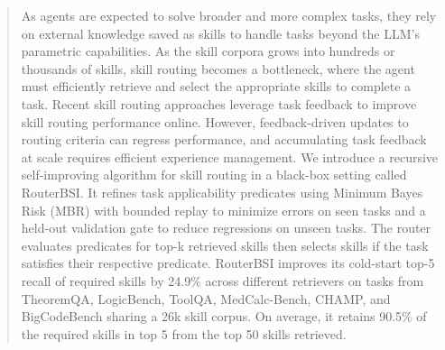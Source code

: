 
\begin{abstract}

As agents are expected to solve broader and more complex tasks, they rely on external knowledge saved as skills to handle tasks beyond the LLM's parametric capabilities. As the skill corpora grows into hundreds or thousands of skills, skill routing becomes a bottleneck, where the agent must efficiently retrieve and select the appropriate skills to complete a task. Recent skill routing approaches leverage task feedback to improve skill routing performance online. However, feedback-driven updates to routing criteria can regress performance, and accumulating task feedback at scale requires efficient experience management. We introduce a recursive self-improving algorithm for skill routing in a black-box setting called RouterBSI. It refines task applicability predicates using Minimum Bayes Risk (MBR) with bounded replay to minimize errors on seen tasks and a held-out validation gate to reduce regressions on unseen tasks. The router evaluates predicates for top-k retrieved skills then selects skills if the task satisfies their respective predicate. RouterBSI improves its cold-start top-5 recall of required skills by 24.9\% across different retrievers on tasks from TheoremQA, LogicBench, ToolQA, MedCalc-Bench, CHAMP, and BigCodeBench sharing a 26k skill corpus. On average, it retains 90.5\% of the required skills in top 5 from the top 50 skills retrieved.

\end{abstract}
